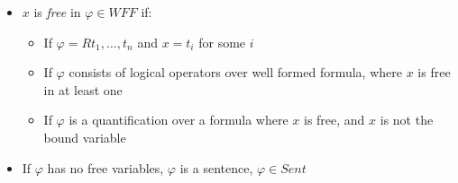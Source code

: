\begin{itemize}
%	
%		
%		
%		
%		
%		

	\item $ x $ is \textit{free} in $ \varphi \in WFF $ if:
	
	\begin{itemize}
		
		\item If $ \varphi = R t_1, \dots, t_n $ and $ x = t_i $ for some $ i $
		
		\item If $ \varphi $ consists of logical operators over well formed formula, where $ x $ is free in at least one
		
		\item If $ \varphi $ is a quantification over a formula where $ x $ is free, and $ x $ is not the bound variable
		
	\end{itemize}

%	
%		
%		
%		
%		
%		

	\item If $ \varphi $ has no free variables, $ \varphi $ is a sentence, $ \varphi \in Sent $
	
\end{itemize}

